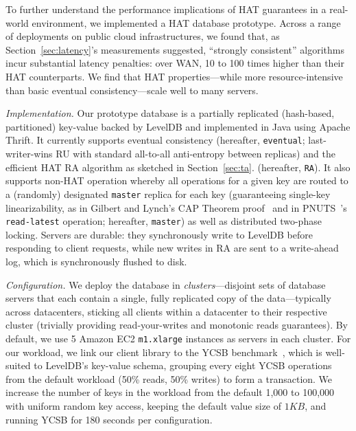 To further understand the performance implications of HAT guarantees
in a real-world environment, we implemented a HAT database
prototype. Across a range of deployments on public cloud
infrastructures, we found that, as Section~\ref{sec:latency}'s
measurements suggested, ``strongly consistent'' algorithms incur
substantial latency penalties: over WAN, 10 to 100 times higher than
their HAT counterparts. We find that HAT
properties---while more resource-intensive than basic eventual
consistency---scale well to many servers.

\vspace{.5em}\noindent\textit{Implementation.} Our prototype database
is a partially replicated (hash-based, partitioned) key-value backed
by LevelDB and implemented in Java using Apache Thrift. It currently
supports eventual consistency (hereafter, \texttt{eventual};
last-writer-wins RU with standard all-to-all anti-entropy between
replicas) and the efficient HAT RA algorithm as sketched in
Section~\ref{sec:ta}. (hereafter, \texttt{RA}). It also supports
non-HAT operation whereby all operations for a given key are routed to
a (randomly) designated \texttt{master} replica for each key
(guaranteeing single-key linearizability, as in Gilbert and Lynch's
CAP Theorem proof~\cite{gilbert-cap} and in PNUTS~\cite{pnuts}'s
\texttt{read-latest} operation; hereafter, \texttt{master}) as well as
distributed two-phase locking. Servers are durable: they synchronously
write to LevelDB before responding to client requests, while new
writes in RA are sent to a write-ahead log, which is synchronously
flushed to disk.

\vspace{.5em}\noindent\textit{Configuration.} We deploy the database
in \textit{clusters}---disjoint sets of database servers that each
contain a single, fully replicated copy of the data---typically across
datacenters, sticking all clients within a datacenter to their
respective cluster (trivially providing read-your-writes and monotonic
reads guarantees). By default, we use 5 Amazon EC2 \texttt{m1.xlarge}
instances as servers in each cluster. For our workload, we link our
client library to the YCSB benchmark~\cite{ycsb}, which is well-suited
to LevelDB's key-value schema, grouping every eight YCSB operations
from the default workload (50\% reads, 50\% writes) to form a
transaction. We increase the number of keys in the workload from the
default 1,000 to 100,000 with uniform random key access, keeping
the default value size of $1KB$, and running YCSB for 180 seconds per
configuration.


